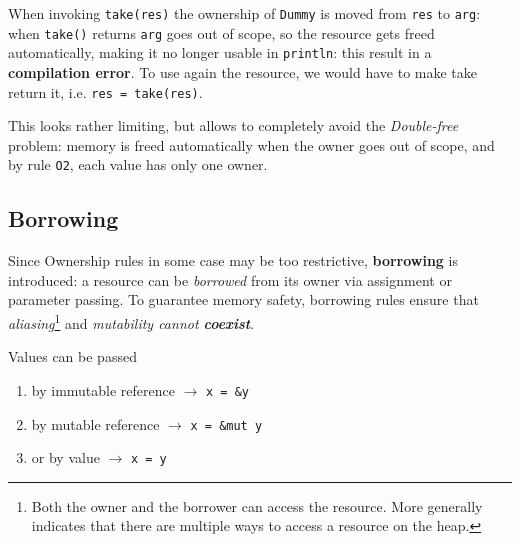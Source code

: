 When invoking \lstinline|take(res)| the ownership of \lstinline|Dummy| is moved from \lstinline|res| to \lstinline|arg|:
when \texttt{take()} returns \lstinline|arg| goes out of scope, so the resource gets freed automatically, making it no longer usable in \lstinline|println|:
this result in a \textbf{compilation error}.
To use again the resource, we would have to make take return it, i.e. \lstinline|res = take(res)|.

This looks rather limiting, but allows to completely avoid the \textit{Double-free} problem:
memory is freed automatically
when the owner goes out of scope, and by rule \texttt{O2}, each value has only one owner.

\subsection{Borrowing}
Since Ownership rules in some case may be too restrictive, \textbf{borrowing} is introduced: a resource can be \textit{borrowed} from its owner via
assignment or parameter passing.
To guarantee memory safety, borrowing rules ensure
that \textit{aliasing}\footnote{Both the owner and the borrower can access the resource.
More generally indicates that there are multiple ways to access a resource on the heap.} and \textit{mutability cannot \textbf{coexist}}.\\
{Values can be passed\ns
\begin{enumerate}
   \item by immutable reference $\longrightarrow$ \lstinline|x = &y|
   \item by mutable reference $\longrightarrow$ \lstinline|x = &mut y|
   \item or by value $\longrightarrow$ \lstinline|x = y|
\end{enumerate}}



